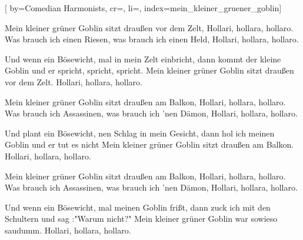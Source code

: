 

[%
    by={Comedian Harmonists},
    cr={},
    li={},
    index={mein_kleiner_gruener_goblin}]


    \label{mein_kleiner_gruener_goblin}

    \beginverse\memorize[verse]
        Mein kleiner grüner Goblin sitzt draußen vor dem Zelt,
        Hollari, hollara, hollaro.
        Was brauch ich einen Riesen, was brauch ich einen Held,
        Hollari, hollara, hollaro.
    \endverse

    \beginchorus\memorize[chorus]
        Und wenn ein Bösewicht, mal in mein Zelt einbricht,
        dann kommt der kleine Goblin und er spricht, spricht, spricht.
        Mein kleiner grüner Goblin sitzt draußen vor dem Zelt.
        Hollari, hollara, hollaro.
    \endchorus


    \beginverse\replay[verse]
        Mein kleiner grüner Goblin sitzt draußen am Balkon,
        Hollari, hollara, hollaro.
        Was brauch ich Assassinen, was brauch ich 'nen Dämon,
        Hollari, hollara, hollaro.
    \endverse

    \beginchorus\replay[chorus]
        Und plant ein Bösewicht, nen Schlag in mein Gesicht,
        dann hol ich meinen Goblin und er tut es nicht
        Mein kleiner grüner Goblin sitzt draußen am Balkon.
        Hollari, hollara, hollaro.
    \endchorus

    \beginverse\replay[verse]
        Mein kleiner grüner Goblin sitzt draußen am Balkon,
        Hollari, hollara, hollaro.
        Was brauch ich Assassinen, was brauch ich 'nen Dämon,
        Hollari, hollara, hollaro.
    \endverse

    \beginchorus\replay[chorus]
        Und wenn ein Bösewicht, mal meinen Goblin frißt,
        dann zuck ich mit den Schultern und sag :"Warum nicht?"
        Mein kleiner grüner Goblin war sowieso saudumm.
        Hollari, hollara, hollaro.
    \endchorus
\endsong
